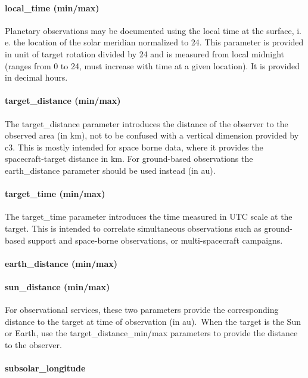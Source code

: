 \documentclass[11pt,a4paper]{ivoa}
\begin{document}
\paragraph{local\_time (min/max)}

Planetary observations may be documented using the local time at the surface, i. e. the location of the solar meridian normalized to 24. This parameter is provided in unit of target rotation divided by 24 and is measured from local midnight (ranges from 0 to 24, must increase with time at a given location). It is provided in decimal hours.

\paragraph{target\_distance (min/max)}

The target\_distance parameter introduces the distance of the observer to the observed area (in km), not to be confused with a vertical dimension provided by c3. This is mostly intended for space borne data, where it provides the spacecraft-target distance in km. For ground-based observations the earth\_distance parameter should be used instead (in au).

\paragraph{target\_time (min/max)}

The target\_time parameter introduces the time measured in UTC scale at the target. This is intended to correlate simultaneous observations such as ground-based support and space-borne observations, or multi-spacecraft campaigns.

\paragraph{earth\_distance (min/max)}

\paragraph{sun\_distance (min/max)}

For observational services, these two parameters provide the corresponding distance to the target at time of observation (in au). When the target is the Sun or Earth, use the target\_distance\_min/max parameters to provide the distance to the observer.

\paragraph{subsolar\_longitude}
\end{document}

